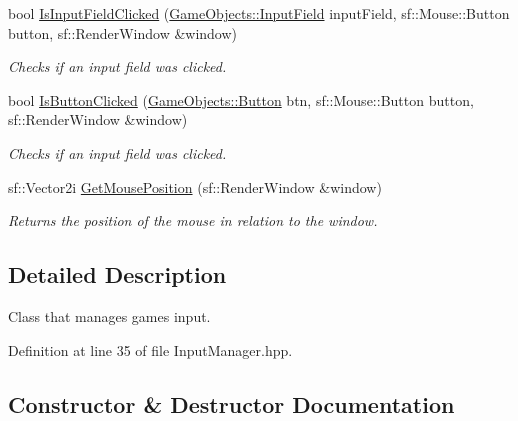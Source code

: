 \begin{DoxyCompactItemize}
bool \mbox{\hyperlink{class_arktis_engine_1_1_input_manager_a3f458f05059579d978aef9bb267f6dbf}{Is\+Input\+Field\+Clicked}} (\mbox{\hyperlink{class_game_objects_1_1_input_field}{Game\+Objects\+::\+Input\+Field}} input\+Field, sf\+::\+Mouse\+::\+Button button, sf\+::\+Render\+Window \&window)
\begin{DoxyCompactList}\small\item\em Checks if an input field was clicked. \end{DoxyCompactList}\item 
bool \mbox{\hyperlink{class_arktis_engine_1_1_input_manager_af97228e4f02054a8d90e6b6ed773ed31}{Is\+Button\+Clicked}} (\mbox{\hyperlink{class_game_objects_1_1_button}{Game\+Objects\+::\+Button}} btn, sf\+::\+Mouse\+::\+Button button, sf\+::\+Render\+Window \&window)
\begin{DoxyCompactList}\small\item\em Checks if an input field was clicked. \end{DoxyCompactList}\item 
sf\+::\+Vector2i \mbox{\hyperlink{class_arktis_engine_1_1_input_manager_ab5bdb467c356e8ca0a058a7b9162f869}{Get\+Mouse\+Position}} (sf\+::\+Render\+Window \&window)
\begin{DoxyCompactList}\small\item\em Returns the position of the mouse in relation to the window. \end{DoxyCompactList}\end{DoxyCompactItemize}


\subsection{Detailed Description}
Class that manages game\textquotesingle{}s input. 

\begin{DoxyVerb}\end{DoxyVerb}
 

Definition at line 35 of file Input\+Manager.\+hpp.



\subsection{Constructor \& Destructor Documentation}
\mbox{\label{class_arktis_engine_1_1_input_manager_af15067de706f4e40cf9c0315ec911b64}} 
